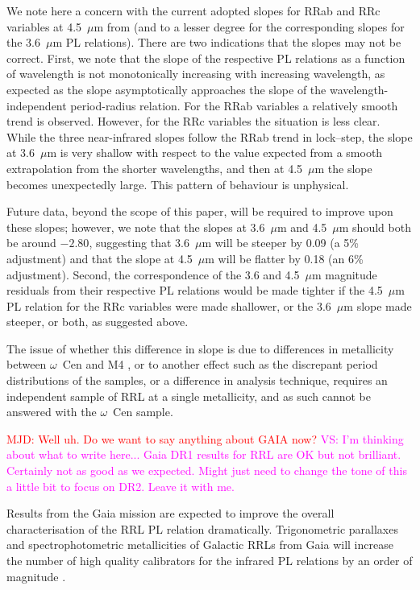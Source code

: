 \documentclass[a4paper,fleqn,usenatbib]{mnras}
\newcommand{\ocen}{$\omega$~Cen\xspace}
\newcommand{\um}{~$\mu$m\xspace}
\providecommand{\vscomment}[1]{{\textcolor{magenta}{{VS: #1}}}\xspace}
\providecommand{\mjdcomment}[1]{{\textcolor{red}{{MJD: #1}}}\xspace}
\begin{document}
We note here a concern with the current adopted slopes for RRab and RRc variables at 4.5\um from \citet{2015ApJ...808...11N} (and to a lesser degree for the corresponding slopes for the 3.6\um PL relations). There are two indications that the slopes may not be correct. First, we note that the slope of the respective PL relations as a function of wavelength is not monotonically increasing with increasing wavelength, as expected as the slope asymptotically approaches the slope of the wavelength-independent period-radius relation. For the RRab variables a relatively smooth trend is observed. However, for the RRc variables the situation is less clear. While the three near-infrared slopes follow the RRab trend in lock--step, the slope at 3.6\um is very shallow with respect to the value expected from a smooth extrapolation from the shorter wavelengths, and then at 4.5\um the slope becomes unexpectedly large. This pattern of behaviour is unphysical.

Future data, beyond the scope of this paper, will be required to improve upon these slopes; however, we note that the slopes at 3.6\um and 4.5\um should both be around $-2.80$, suggesting that 3.6\um will be steeper by 0.09 (a 5\% adjustment) and that the slope at 4.5\um  will be flatter by 0.18 (an 6\% adjustment). Second, the correspondence of the 3.6 and 4.5\um magnitude residuals from their respective PL relations would be made tighter if the 4.5\um PL relation for the RRc variables were made shallower, or the 3.6\um slope made steeper, or both, as suggested above.

The issue of whether this difference in slope is due to differences in metallicity between \ocen and M4 \citep[the calibrating sample in][]{2015ApJ...808...11N}, or to another effect such as the discrepant period distributions of the samples, or a difference in analysis technique, requires an independent sample of RRL at a single metallicity, and as such cannot be answered with the \ocen sample. 

\mjdcomment{Well uh. Do we want to say anything about GAIA now?}
\vscomment{I'm thinking about what to write here... Gaia DR1 results for RRL are OK but not brilliant. Certainly not as good as we expected. Might just need to change the tone of this a little bit to focus on DR2. Leave it with me.}

Results from the Gaia mission \citep{1996A&AS..116..579L} are expected to improve the overall characterisation of the RRL PL relation dramatically. Trigonometric parallaxes and spectrophotometric metallicities of Galactic RRLs from Gaia will increase the number of high quality calibrators for the infrared PL relations by an order of magnitude \citep[Scowcroft et al. 2016b, in prep., Beaton et al. 2016, in prep.]{2012MNRAS.426.2463L}. 
\end{document}
